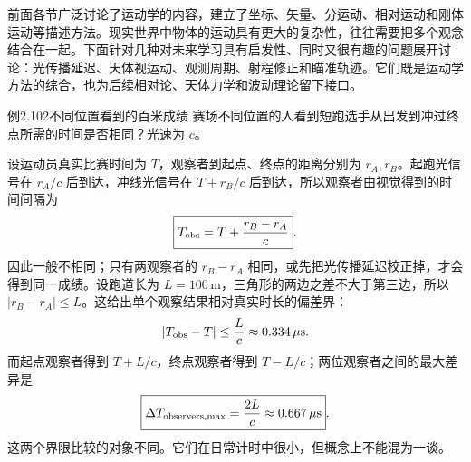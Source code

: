 
前面各节广泛讨论了运动学的内容，建立了坐标、矢量、分运动、相对运动和刚体运动等描述方法。现实世界中物体的运动具有更大的复杂性，往往需要把多个观念结合在一起。下面针对几种对未来学习具有启发性、同时又很有趣的问题展开讨论：光传播延迟、天体视运动、观测周期、射程修正和瞄准轨迹。它们既是运动学方法的综合，也为后续相对论、天体力学和波动理论留下接口。

\KinematicKeepSpace{9cm}
\begin{origexamplebox}{例2.102\quad 不同位置看到的百米成绩}
赛场不同位置的人看到短跑选手从出发到冲过终点所需的时间是否相同？光速为 $c$。
\end{origexamplebox}
\begin{xesolution}
设运动员真实比赛时间为 $T$，观察者到起点、终点的距离分别为 $r_A,r_B$。起跑光信号在 $r_A/c$ 后到达，冲线光信号在 $T+r_B/c$ 后到达，所以观察者由视觉得到的时间间隔为
\LightTimingDiagram
\[
\boxed{T_{\rm obs}=T+\frac{r_B-r_A}{c}}.
\]
因此一般不相同；只有两观察者的 $r_B-r_A$ 相同，或先把光传播延迟校正掉，才会得到同一成绩。设跑道长为 $L=100\,\mathrm m$，三角形的两边之差不大于第三边，所以 $|r_B-r_A|\le L$。这给出单个观察结果相对真实时长的偏差界：
\[
|T_{\rm obs}-T|\le\frac Lc\approx0.334\,\mu\mathrm s.
\]
而起点观察者得到 $T+L/c$，终点观察者得到 $T-L/c$；两位观察者之间的最大差异是
\[
\boxed{\Delta T_{\rm observers,max}=\frac{2L}{c}\approx0.667\,\mu\mathrm s}.
\]
这两个界限比较的对象不同。它们在日常计时中很小，但概念上不能混为一谈。
\end{xesolution}

